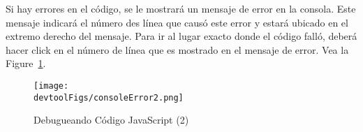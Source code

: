 Si hay errores en el código, se le mostrará un mensaje de error en la consola. Este mensaje indicará el número des línea que causó este error y estará ubicado en el extremo derecho del mensaje. Para ir al lugar exacto donde el código falló, deberá hacer click en el número de línea que es mostrado en el mensaje de error.
Vea la Figure~\ref{devtool:fig:console}.


\begin{figure}[htb]
\begin{center}
  \texttt{[image: \\devtoolFigs/consoleError2.png]}
\end{center}
\caption{Debugueando Código JavaScript (2)}
\label{devtool:fig:console}
\end{figure}
 




 

